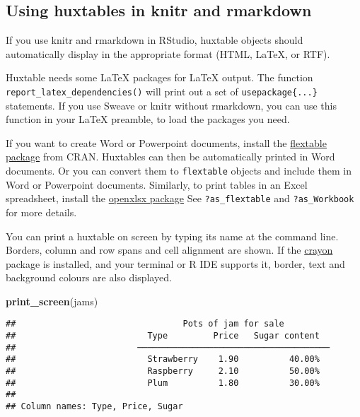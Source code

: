 \documentclass[]{article}
\newenvironment{Shaded}{\begin{snugshade}}{\end{snugshade}}
\newcommand{\KeywordTok}[1]{\textcolor[rgb]{0.13,0.29,0.53}{\textbf{#1}}}
\newcommand{\NormalTok}[1]{#1}
\begin{document}
\FloatBarrier

\hypertarget{using-huxtables-in-knitr-and-rmarkdown}{%
\subsection{Using huxtables in knitr and
rmarkdown}\label{using-huxtables-in-knitr-and-rmarkdown}}

If you use knitr and rmarkdown in RStudio, huxtable objects should
automatically display in the appropriate format (HTML, LaTeX, or RTF).

Huxtable needs some LaTeX packages for LaTeX output. The function
\texttt{report\_latex\_dependencies()} will print out a set of
\texttt{usepackage\{...\}} statements. If you use Sweave or knitr
without rmarkdown, you can use this function in your LaTeX preamble, to
load the packages you need.

If you want to create Word or Powerpoint documents, install the
\href{https://cran.r-project.org/package=flextable}{flextable package}
from CRAN. Huxtables can then be automatically printed in Word
documents. Or you can convert them to \texttt{flextable} objects and
include them in Word or Powerpoint documents. Similarly, to print tables
in an Excel spreadsheet, install the
\href{https://cran.r-project.org/package=openxlsx}{openxlsx package} See
\texttt{?as\_flextable} and \texttt{?as\_Workbook} for more details.

You can print a huxtable on screen by typing its name at the command
line. Borders, column and row spans and cell alignment are shown. If the
\href{https://cran.r-project.org/package=crayon}{crayon} package is
installed, and your terminal or R IDE supports it, border, text and
background colours are also displayed.

\begin{Shaded}
\begin{Highlighting}[]
\KeywordTok{print_screen}\NormalTok{(jams)}
\end{Highlighting}
\end{Shaded}

\begin{verbatim}
##                                 Pots of jam for sale                                
##                          Type         Price   Sugar content  
##                        ──────────────────────────────────────
##                          Strawberry    1.90          40.00%  
##                          Raspberry     2.10          50.00%  
##                          Plum          1.80          30.00%  
## 
## Column names: Type, Price, Sugar
\end{verbatim}
\end{document}
